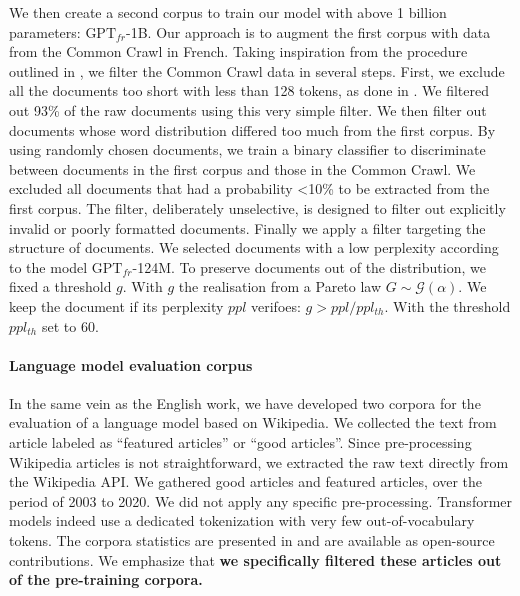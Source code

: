 We then create a second corpus to train our model with above 1 billion parameters: $\text{GPT}_{fr}$-1B. Our approach is to augment the first corpus with data from the Common Crawl in French. Taking inspiration from the procedure outlined in \textcite{brown_20}, we filter the Common Crawl data in several steps. First, we exclude all the documents too short with less than 128 tokens, as done in \textcite{shoeybi_19}. We filtered out 93\% of the raw documents using this very simple filter. We then filter out documents whose word distribution differed too much from the first corpus. By using   randomly chosen documents, we train a binary classifier to discriminate between documents in the first corpus and those in the Common Crawl. We excluded all documents that had a probability <10\% to be extracted from the first corpus. The filter, deliberately unselective, is designed to filter out explicitly invalid or poorly formatted documents. Finally we apply a filter targeting the structure of documents. We selected documents with a low perplexity  according to the model $\text{GPT}_{fr}$-124M. To preserve documents out of the distribution, we fixed a threshold $g$. With $g$ the realisation from a Pareto law $G \sim \mathcal{G}(\alpha)$. We keep the document if its perplexity $ppl$ verifoes: $g > ppl / ppl_{th}$. With the threshold $ppl_{th}$ set to 60.

\paragraph{Language model evaluation corpus} In the same vein as the English work, we have developed two corpora for the evaluation of a language model based on Wikipedia. We collected the text from article labeled as “featured articles” or “good articles”. Since pre-processing Wikipedia articles is not straightforward, we extracted the raw text directly from the Wikipedia API. We gathered  good articles and  featured articles, over the period of 2003 to 2020. We did not apply any specific pre-processing. Transformer models indeed use a dedicated tokenization with very few out-of-vocabulary tokens. The corpora statistics are presented in  and are available as open-source contributions. We emphasize that \textbf{we specifically filtered these articles out of the pre-training corpora.}

